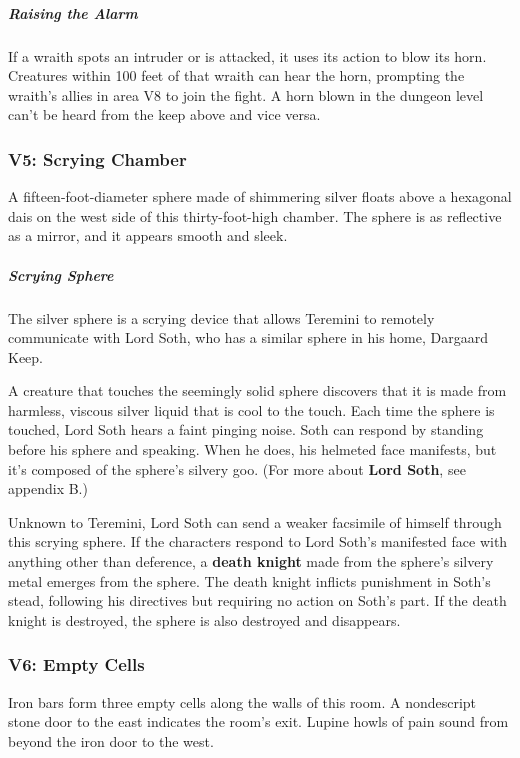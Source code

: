 \documentclass[10pt,a4paper,twoside,bg=print,twocolumn,openany,nodeprecatedcode]{dndbook}
\begin{document}
\subparagraph{Raising the Alarm}
If a wraith spots an intruder or is attacked, it uses its action to blow its horn. Creatures within 100 feet of that wraith can hear the horn, prompting the wraith's allies in area V8 to join the fight. A horn blown in the dungeon level can't be heard from the keep above and vice versa.

\subsubsection{V5: Scrying Chamber}
\begin{DndReadAloud}{}
A fifteen-foot-diameter sphere made of shimmering silver floats above a hexagonal dais on the west side of this thirty-foot-high chamber. The sphere is as reflective as a mirror, and it appears smooth and sleek.

\end{DndReadAloud}

\subparagraph{Scrying Sphere}
The silver sphere is a scrying device that allows Teremini to remotely communicate with Lord Soth, who has a similar sphere in his home, Dargaard Keep.

A creature that touches the seemingly solid sphere discovers that it is made from harmless, viscous silver liquid that is cool to the touch. Each time the sphere is touched, Lord Soth hears a faint pinging noise. Soth can respond by standing before his sphere and speaking. When he does, his helmeted face manifests, but it's composed of the sphere's silvery goo. (For more about \textbf{Lord Soth}, see appendix B.)

Unknown to Teremini, Lord Soth can send a weaker facsimile of himself through this scrying sphere. If the characters respond to Lord Soth's manifested face with anything other than deference, a \textbf{death knight} made from the sphere's silvery metal emerges from the sphere. The death knight inflicts punishment in Soth's stead, following his directives but requiring no action on Soth's part. If the death knight is destroyed, the sphere is also destroyed and disappears.

\subsubsection{V6: Empty Cells}
\begin{DndReadAloud}{}
Iron bars form three empty cells along the walls of this room. A nondescript stone door to the east indicates the room's exit. Lupine howls of pain sound from beyond the iron door to the west.

\end{DndReadAloud}
\end{document}
